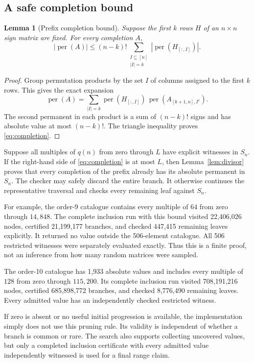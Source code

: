 \documentclass[11pt,a4paper]{article}
\newtheorem{lemma}[theorem]{Lemma}
\theoremstyle{remark}\newtheorem{remark}[theorem]{Remark}
\DeclareMathOperator{\per}{per}
\begin{document}
\subsection{A safe completion bound}
\begin{lemma}[Prefix completion bound]\label{lem:completion}
Suppose the first $k$ rows $H$ of an $n\times n$ sign matrix are fixed. For every completion $A$,
\begin{equation}\label{eq:completion}
 |\per(A)|\leq (n-k)!\sum_{\substack{I\subseteq[n]\\|I|=k}}|\per(H_{[:,I]})|.
\end{equation}
\end{lemma}
\begin{proof}
Group permutation products by the set $I$ of columns assigned to the first $k$ rows. This gives the exact expansion
\[
 \per(A)=\sum_{|I|=k}\per(H_{[:,I]})\,
 \per(A_{[k+1,n],I^c}).
\]
The second permanent in each product is a sum of $(n-k)!$ signs and has absolute value at most $(n-k)!$. The triangle inequality proves \eqref{eq:completion}.
\end{proof}

Suppose all multiples of $q(n)$ from zero through $L$ have explicit witnesses in $S_n$. If the right-hand side of \eqref{eq:completion} is at most $L$, then Lemma~\ref{lem:divisor} proves that every completion of the prefix already has its absolute permanent in $S_n$. The checker may safely discard the entire branch. It otherwise continues the representative traversal and checks every remaining leaf against $S_n$.

For example, the order-9 catalogue contains every multiple of $64$ from zero through $14,848$. The complete inclusion run with this bound visited 22,406,026 nodes, certified 21,199,177 branches, and checked 447,415 remaining leaves explicitly. It returned no value outside the 506-element catalogue. All 506 restricted witnesses were separately evaluated exactly. Thus this is a finite proof, not an inference from how many random matrices were sampled.

The order-10 catalogue has 1,933 absolute values and includes every multiple of $128$ from zero through $115,200$. Its complete inclusion run visited 708,191,216 nodes, certified 685,898,772 branches, and checked 8,776,490 remaining leaves. Every admitted value has an independently checked restricted witness.

If zero is absent or no useful initial progression is available, the implementation simply does not use this pruning rule. Its validity is independent of whether a branch is common or rare. The search also supports collecting uncovered values, but only a completed inclusion certificate with every admitted value independently witnessed is used for a final range claim.
\end{document}
